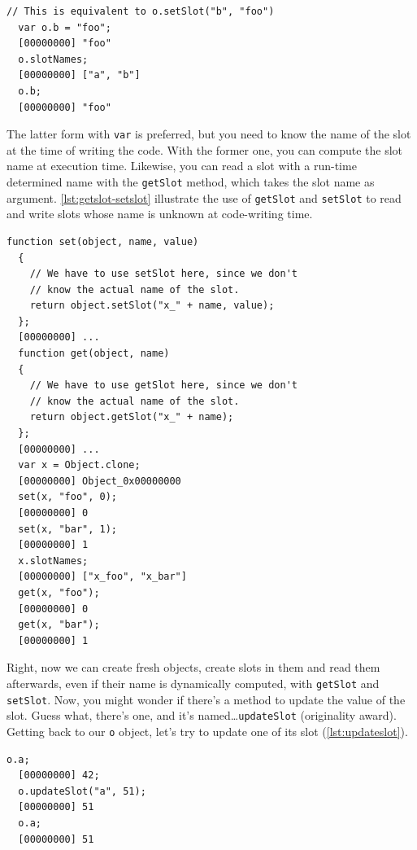\documentclass[openright,twoside,12pt]{report}
\newcommand{\lst}[1]{\autoref{lst:#1}}
\begin{document}
\begin{lstlisting}[caption=Defining slots with var, label=lst:setslot-var]
  // This is equivalent to o.setSlot("b", "foo")
  var o.b = "foo";
  [00000000] "foo"
  o.slotNames;
  [00000000] ["a", "b"]
  o.b;
  [00000000] "foo"
\end{lstlisting}

The latter form with \texttt{var} is preferred, but you need to know
the name of the slot at the time of writing the code. With the former
one, you can compute the slot name at execution time. Likewise, you
can read a slot with a run-time determined name with the
\texttt{getSlot} method, which takes the slot name as
argument. \lst{getslot-setslot} illustrate the use of \texttt{getSlot}
and \texttt{setSlot} to read and write slots whose name is unknown at
code-writing time.


\begin{lstlisting}[caption=Dynamic slots with getSlot and setSlot,
  label=lst:getslot-setslot]
  function set(object, name, value)
  {
    // We have to use setSlot here, since we don't
    // know the actual name of the slot.
    return object.setSlot("x_" + name, value);
  };
  [00000000] ...
  function get(object, name)
  {
    // We have to use getSlot here, since we don't
    // know the actual name of the slot.
    return object.getSlot("x_" + name);
  };
  [00000000] ...
  var x = Object.clone;
  [00000000] Object_0x00000000
  set(x, "foo", 0);
  [00000000] 0
  set(x, "bar", 1);
  [00000000] 1
  x.slotNames;
  [00000000] ["x_foo", "x_bar"]
  get(x, "foo");
  [00000000] 0
  get(x, "bar");
  [00000000] 1
\end{lstlisting}

Right, now we can create fresh objects, create slots in them and read
them afterwards, even if their name is dynamically computed, with
\texttt{getSlot} and \texttt{setSlot}. Now, you might wonder if
there's a method to update the value of the slot. Guess what, there's
one, and it's named\ldots \texttt{updateSlot} (originality
award). Getting back to our \texttt{o} object, let's try to update one
of its slot (\lst{updateslot}).

\begin{lstlisting}[caption=Updating a slot, label=lst:updateslot]
  o.a;
  [00000000] 42;
  o.updateSlot("a", 51);
  [00000000] 51
  o.a;
  [00000000] 51
\end{lstlisting}
\end{document}
